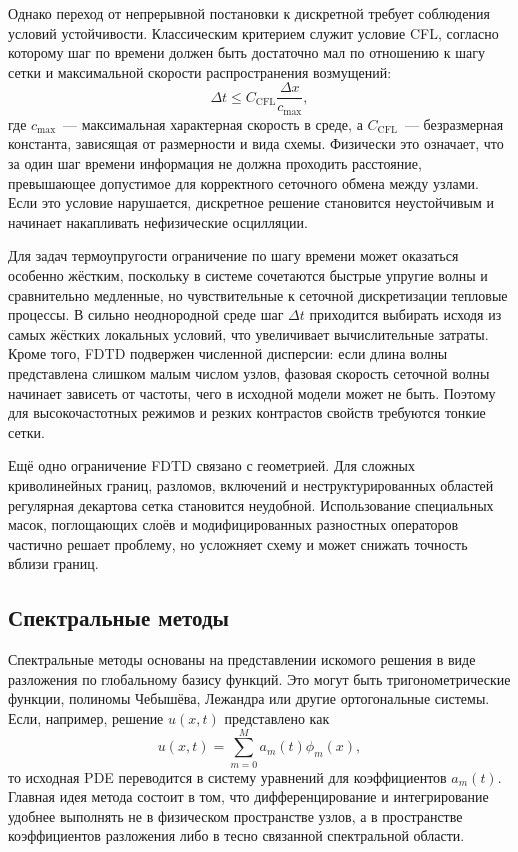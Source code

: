 Однако переход от непрерывной постановки к дискретной требует соблюдения условий устойчивости. Классическим критерием служит условие CFL, согласно которому шаг по времени должен быть достаточно мал по отношению к шагу сетки и максимальной скорости распространения возмущений:
\begin{equation}
\Delta t \le C_{\mathrm{CFL}}\frac{\Delta x}{c_{\max}},
\end{equation}
где $c_{\max}$~--- максимальная характерная скорость в среде, а $C_{\mathrm{CFL}}$~--- безразмерная константа, зависящая от размерности и вида схемы. Физически это означает, что за один шаг времени информация не должна проходить расстояние, превышающее допустимое для корректного сеточного обмена между узлами. Если это условие нарушается, дискретное решение становится неустойчивым и начинает накапливать нефизические осцилляции.

Для задач термоупругости ограничение по шагу времени может оказаться особенно жёстким, поскольку в системе сочетаются быстрые упругие волны и сравнительно медленные, но чувствительные к сеточной дискретизации тепловые процессы. В сильно неоднородной среде шаг $\Delta t$ приходится выбирать исходя из самых жёстких локальных условий, что увеличивает вычислительные затраты. Кроме того, FDTD подвержен численной дисперсии: если длина волны представлена слишком малым числом узлов, фазовая скорость сеточной волны начинает зависеть от частоты, чего в исходной модели может не быть. Поэтому для высокочастотных режимов и резких контрастов свойств требуются тонкие сетки.

Ещё одно ограничение FDTD связано с геометрией. Для сложных криволинейных границ, разломов, включений и неструктурированных областей регулярная декартова сетка становится неудобной. Использование специальных масок, поглощающих слоёв и модифицированных разностных операторов частично решает проблему, но усложняет схему и может снижать точность вблизи границ.

\subsection*{Спектральные методы}

Спектральные методы основаны на представлении искомого решения в виде разложения по глобальному базису функций. Это могут быть тригонометрические функции, полиномы Чебышёва, Лежандра или другие ортогональные системы. Если, например, решение $u(x,t)$ представлено как
\begin{equation}
u(x,t)=\sum_{m=0}^{M} a_m(t)\phi_m(x),
\end{equation}
то исходная PDE переводится в систему уравнений для коэффициентов $a_m(t)$. Главная идея метода состоит в том, что дифференцирование и интегрирование удобнее выполнять не в физическом пространстве узлов, а в пространстве коэффициентов разложения либо в тесно связанной спектральной области.

